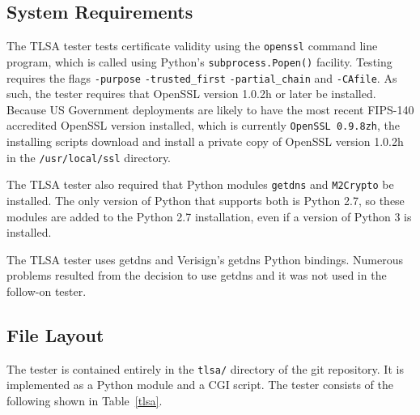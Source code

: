 \documentclass[preprint,5p]{elsarticle}
\begin{document}
\subsection{System Requirements}

The TLSA tester tests certificate validity using the \verb+openssl+
command line program, which is called using Python's \verb+subprocess.Popen()+
facility. Testing requires the flags \verb+-purpose+
\verb+-trusted_first+ \verb+-partial_chain+ and \verb+-CAfile+. As
such, the tester requires that OpenSSL version 1.0.2h or later be
installed.  Because US Government deployments are likely to have the
most recent FIPS-140 accredited OpenSSL version installed, which is
currently \verb+OpenSSL 0.9.8zh+, the installing scripts download and
install a private copy of OpenSSL version 1.0.2h in the
\verb+/usr/local/ssl+ directory.

The TLSA tester also required that Python modules \verb+getdns+ and
\verb+M2Crypto+ be installed. The only version of Python that supports
both is Python 2.7, so these modules are added to the Python 2.7
installation, even if a version of Python 3 is installed.

The TLSA tester uses getdns and Verisign's getdns Python
bindings. Numerous problems resulted from the decision to use getdns
and it was not used in the follow-on tester.

\subsection{File Layout}

The tester is contained entirely in the {\tt tlsa/} directory of the
git repository. It is implemented as a Python module and a CGI
script. The tester consists of the following shown in Table~\ref{tlsa}.
\end{document}

